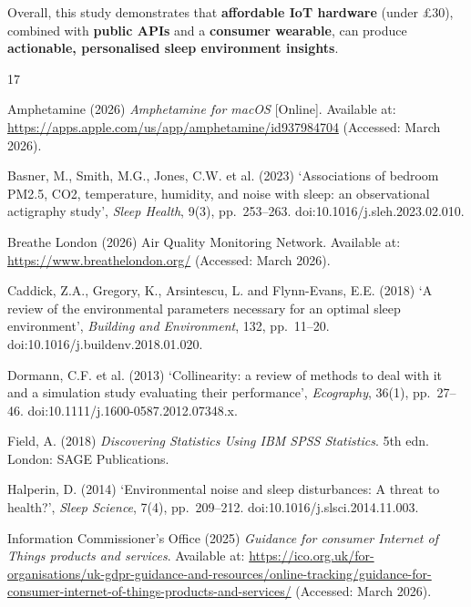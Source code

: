 \documentclass[10pt,a4paper]{extarticle}
\begin{document}
\begin{tcolorbox}[colback=imperialblue!4, colframe=imperialblue, coltext=black, boxrule=0pt, leftrule=3pt, arc=0pt, left=8pt, right=8pt, top=6pt, bottom=6pt]
Overall, this study demonstrates that \textbf{affordable IoT hardware} (under \pounds30), combined with \textbf{public APIs} and a \textbf{consumer wearable}, can produce \textbf{actionable, personalised sleep environment insights}.
\end{tcolorbox}

\newpage
\begin{thebibliography}{17}

Amphetamine (2026) \textit{Amphetamine for macOS} [Online]. Available at: \url{https://apps.apple.com/us/app/amphetamine/id937984704} (Accessed: March 2026).

Basner, M., Smith, M.G., Jones, C.W. et al. (2023) `Associations of bedroom PM2.5, CO2, temperature, humidity, and noise with sleep: an observational actigraphy study', \textit{Sleep Health}, 9(3), pp.~253--263. doi:10.1016/j.sleh.2023.02.010.

Breathe London (2026) Air Quality Monitoring Network. Available at: \url{https://www.breathelondon.org/} (Accessed: March 2026).

Caddick, Z.A., Gregory, K., Arsintescu, L. and Flynn-Evans, E.E. (2018) `A review of the environmental parameters necessary for an optimal sleep environment', \textit{Building and Environment}, 132, pp.~11--20. doi:10.1016/j.buildenv.2018.01.020.

Dormann, C.F. et al. (2013) `Collinearity: a review of methods to deal with it and a simulation study evaluating their performance', \textit{Ecography}, 36(1), pp.~27--46. doi:10.1111/j.1600-0587.2012.07348.x.

Field, A. (2018) \textit{Discovering Statistics Using IBM SPSS Statistics}. 5th edn. London: SAGE Publications.

Halperin, D. (2014) `Environmental noise and sleep disturbances: A threat to health?', \textit{Sleep Science}, 7(4), pp.~209--212. doi:10.1016/j.slsci.2014.11.003.

Information Commissioner's Office (2025) \textit{Guidance for consumer Internet of Things products and services}. Available at: \url{https://ico.org.uk/for-organisations/uk-gdpr-guidance-and-resources/online-tracking/guidance-for-consumer-internet-of-things-products-and-services/} (Accessed: March 2026).


\end{thebibliography}
\end{document}
